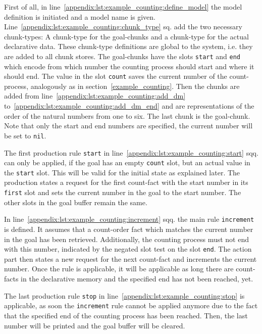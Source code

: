 First of all, in line~\ref{appendix:lst:example_counting:define_model} the model definition is initiated and a model name is given. Line~\ref{appendix:lst:example_counting:chunk_type} sq. add the two necessary chunk-types: A chunk-type for the goal-chunks and a chunk-type for the actual declarative data. These chunk-type definitions are global to the system, i.e. they are added to all chunk stores. The goal-chunks have the slots \lstinline|start| and \lstinline|end| which encode from which number the counting process should start and where it should end. The value in the slot \lstinline|count| saves the current number of the count-process, analogously as in section~\ref{example_counting}. Then the chunks are added from line~\ref{appendix:lst:example_counting:add_dm} to~\ref{appendix:lst:example_counting:add_dm_end} and are representations of the order of the natural numbers from one to six. The last chunk is the goal-chunk. Note that only the start and end numbers are specified, the current number will be set to \lstinline|nil|.

The first production rule \lstinline|start| in line~\ref{appendix:lst:example_counting:start} sqq. can only be applied, if the goal has an empty \lstinline|count| slot, but an actual value in the \lstinline|start| slot. This will be valid for the initial state as explained later. The production states a request for the first count-fact with the start number in its \lstinline|first| slot and sets the current number in the goal to the start number. The other slots in the goal buffer remain the same.

In line~\ref{appendix:lst:example_counting:increment} sqq. the main rule \lstinline|increment| is defined. It assumes that a count-order fact which matches the current number in the goal has been retrieved. Additionally, the counting process must not end with this number, indicated by the negated slot test on the slot \lstinline|end|. The action part then states a new request for the next count-fact and increments the current number. Once the rule is applicable, it will be applicable as long there are count-facts in the declarative memory and the specified end has not been reached, yet.

The last production rule \lstinline|stop| in line~\ref{appendix:lst:example_counting:stop} is applicable, as soon the \lstinline|increment| rule cannot be applied anymore due to the fact that the specified end of the counting process has been reached. Then, the last number will be printed and the goal buffer will be cleared.

